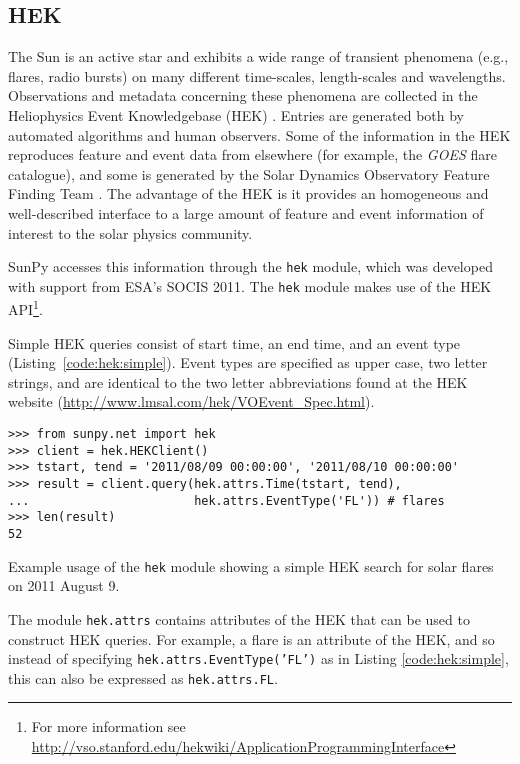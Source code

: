 \subsection{HEK}\label{ssec:hek}

The Sun is an active star and exhibits a wide range of transient phenomena 
(e.g., flares, radio bursts) on many different time-scales, length-scales and 
wavelengths. Observations and metadata concerning these phenomena are collected 
in the Heliophysics Event Knowledgebase (HEK) \citep{hek2012}.  Entries are generated both by 
automated algorithms and human observers.  Some of the information in the HEK 
reproduces feature and event data from elsewhere (for example, the \textit{GOES} flare catalogue),
and some is generated by the Solar Dynamics Observatory Feature Finding Team 
\citep{martens2012}.  The advantage of the HEK is it 
provides an homogeneous and well-described interface to a large amount of 
feature and event information of interest to the solar physics community.

SunPy accesses this information through the \texttt{hek} module, which was
developed with support from ESA's SOCIS 2011.  The \texttt{hek} module makes 
use of the 
HEK API\footnote{For more information see 
\href{http://vso.stanford.edu/hekwiki/ApplicationProgrammingInterface}{http://vso.stanford.edu/hekwiki/ApplicationProgrammingInterface}}.

Simple HEK queries consist of start time, an end time, and an event type 
(Listing~\ref{code:hek:simple}). Event types are specified as upper case, 
two letter strings, and are 
identical to the two letter abbreviations found at the HEK website
(\url{http://www.lmsal.com/hek/VOEvent_Spec.html}).

\begin{listing}[H]
\begin{verbatim}
>>> from sunpy.net import hek
>>> client = hek.HEKClient()
>>> tstart, tend = '2011/08/09 00:00:00', '2011/08/10 00:00:00'
>>> result = client.query(hek.attrs.Time(tstart, tend), 
...                       hek.attrs.EventType('FL')) # flares
>>> len(result)
52
\end{verbatim}
\caption{Example usage of the \texttt{hek} module showing a simple HEK search for solar flares
on 2011 August 9.}
\label{code:hek:simple}
\end{listing}

The module \texttt{hek.attrs} contains attributes of the HEK that can be used to
construct HEK queries.  For example, a flare is an attribute of the HEK, and so 
instead of specifying \texttt{hek.attrs.EventType('FL')} as in Listing 
\ref{code:hek:simple}, this can also be expressed as \texttt{hek.attrs.FL}. 

